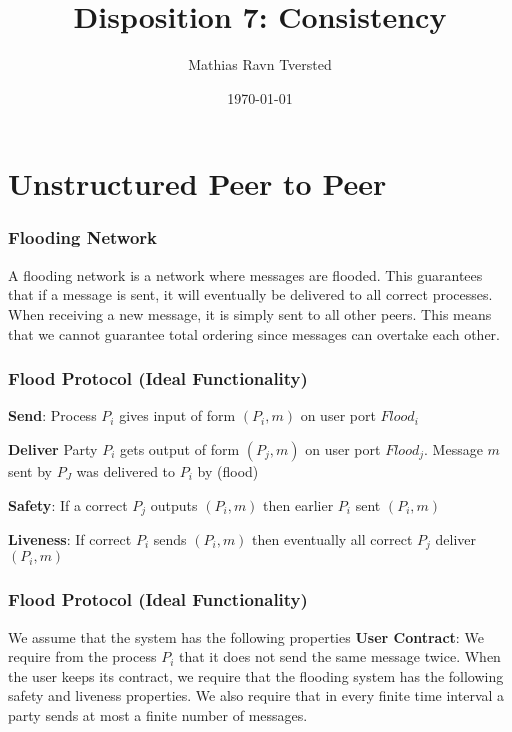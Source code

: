 
\newcommand{\N}{\mathbb{N}}

\title{Disposition 7: Consistency}   
\author{Mathias Ravn Tversted} 
\date{\today} 



\frame{\titlepage} 








\section{Unstructured Peer to Peer}
    \begin{frame}
        \frametitle{Flooding Network}
            A flooding network is a network where messages are flooded. This guarantees that if a message is sent, it will eventually be delivered to all correct processes. When receiving a new message, it is simply sent to all other peers. This means that we cannot guarantee total ordering since messages can overtake each other. 
    \end{frame}
    \begin{frame}
        \frametitle{Flood Protocol (Ideal Functionality)}
            \textbf{Send}: Process $P_i$ gives input of form $(P_i, m)$ on user port $Flood_i$


            \textbf{Deliver} Party $P_i$ gets output of form $(P_j, m)$ on user port $Flood_j$. Message $m$ sent by $P_J$ was delivered to $P_i$ by (flood)

            \textbf{Safety}: If a correct $P_j$ outputs $(P_i, m)$ then earlier $P_i$ sent $(P_i, m)$


            \textbf{Liveness}: If correct $P_i$ sends $(P_i, m)$ then eventually all correct $P_j$ deliver $(P_i, m)$
    \end{frame}

    \begin{frame}
            \frametitle{Flood Protocol (Ideal Functionality)}
        We assume that the system has the following properties
            \textbf{User Contract}: We require from the process $P_i$ that it does not send the same message twice. When the user keeps its contract, we require that the flooding system has the following safety and liveness properties. We also require that in every finite time interval a party sends at most a finite number of messages.
    \end{frame}


